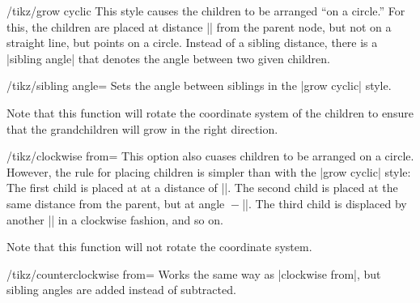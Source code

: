 \begin{key}{/tikz/grow cyclic}
  This style causes the children to be arranged ``on a circle.'' For
  this, the children are placed at distance |\tikzleveldistance| from
  the parent node, but not on a straight line, but points on a
  circle. Instead of a sibling distance, there is a |sibling angle|
  that denotes the angle between two given children.
  \begin{key}{/tikz/sibling angle=}
    Sets the angle between siblings in the |grow cyclic| style.
  \end{key}
  Note that this function will rotate the coordinate system of the
  children to ensure that the grandchildren will grow in the right
  direction.
\begin{codeexample}[]
\end{codeexample}
\end{key}

\begin{key}{/tikz/clockwise from=}
  This option also cuases children to be arranged on a
  circle. However, the rule for placing children is simpler than with
  the |grow cyclic| style: The first child is placed at
   at a distance of |\tikzleveldistance|. The second child
  is placed at the same distance from the parent, but at angle
  ${}-{}$|\tikzsiblingangle|. The third child is displaced
  by another |\tikzsiblingangle| in a clockwise fashion, and so on. 

  Note that this function will not rotate the coordinate system.
\begin{codeexample}[]
\end{codeexample}
\end{key}

\begin{key}{/tikz/counterclockwise from=}
  Works the same way as |clockwise from|, but sibling angles are added
  instead of subtracted.
\end{key}

